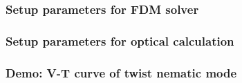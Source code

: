 \documentclass{beamer}
\begin{document}
\begin{frame}
\frametitle{Setup parameters for FDM solver}
\end{frame}
\begin{frame}
\frametitle{Setup parameters for optical calculation}
\end{frame}
\begin{frame}
\frametitle{Demo: V-T curve of twist nematic mode}
\end{frame}
\end{document}
